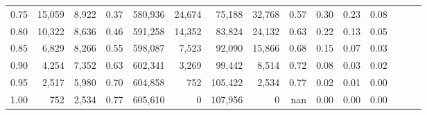 \begin{tabular}{rrrrrrrrrrrrrrr}
0.75 &  15,059 &  8,922 &  0.37 &  580,936 &   24,674 &   75,188 &   32,768 &  0.57 &  0.30 &  0.23 &      0.08 \\
0.80 &  10,322 &  8,636 &  0.46 &  591,258 &   14,352 &   83,824 &   24,132 &  0.63 &  0.22 &  0.13 &      0.05 \\
0.85 &   6,829 &  8,266 &  0.55 &  598,087 &    7,523 &   92,090 &   15,866 &  0.68 &  0.15 &  0.07 &      0.03 \\
0.90 &   4,254 &  7,352 &  0.63 &  602,341 &    3,269 &   99,442 &    8,514 &  0.72 &  0.08 &  0.03 &      0.02 \\
0.95 &   2,517 &  5,980 &  0.70 &  604,858 &      752 &  105,422 &    2,534 &  0.77 &  0.02 &  0.01 &      0.00 \\
1.00 &     752 &  2,534 &  0.77 &  605,610 &        0 &  107,956 &        0 &   nan &  0.00 &  0.00 &      0.00 \\
\bottomrule
\end{tabular}
